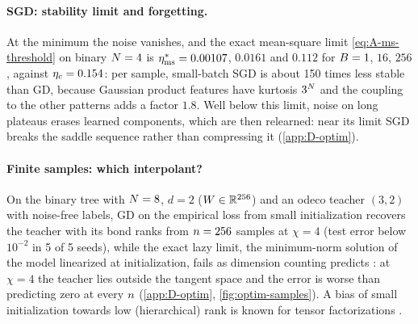 \paragraph{SGD: stability limit and forgetting.}
\derived{} \empirical{}   At the minimum
the noise vanishes, and the exact mean-square limit \eqref{eq:A-ms-threshold} on binary $N=4$ is
$\eta^*_{\rm ms}=0.00107$, $0.0161$ and $0.112$ for $B=1$, $16$, $256$, against $\eta_c=0.154$: per sample,
small-batch SGD is about 150 times less stable than GD, because Gaussian product features have kurtosis $3^N$ and
the coupling to the other patterns adds a factor $1.8$. Well below this limit, noise on long plateaus erases learned
components, which are then relearned: near its limit SGD breaks the saddle sequence rather than compressing it
(\cref{app:D-optim}).

\paragraph{Finite samples: which interpolant?}
\empirical{}  On the binary tree with $N=8$, $d=2$ ($W\in\mathbb{R}^{256}$) and an odeco
teacher $(3,2)$ with noise-free labels, GD on the empirical loss from small initialization recovers the teacher with
its bond ranks from $n=256$ samples at $\chi=4$ (test error below $10^{-2}$ in 5 of 5 seeds), while the exact
lazy limit, the minimum-norm solution of the model linearized at initialization, fails as dimension counting
predicts \derived: at $\chi=4$ the teacher lies outside the tangent space and the error is worse than predicting zero
at every $n$ (\cref{app:D-optim}, \cref{fig:optim-samples}). A bias of small initialization towards low
(hierarchical) rank is known for tensor factorizations .


